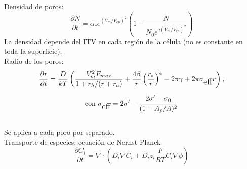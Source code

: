 \documentclass[a0,portrait]{a0poster}
\begin{document}
\begin{multicols}{2}

	Densidad de poros:
	\begin{equation}
		\frac{\partial N}{\partial t} = \alpha_c e^{(V_m/V_{ep})^2} 
			\left( 1 - \frac{N}{N_0 e^{q \left(V_m/V_{ep} \right) ^2}} \right)
	\end{equation}
	La densidad depende del ITV en cada región de la célula 
	(no es constante en toda la superficie).\\


	Radio de los poros:
	\begin{equation}
		\frac{\partial r}{\partial t} = \frac{D}{kT} \left( \frac{V_m^2 F_{max}}
			{1+r_h / (r+r_a)} + \frac{4 \beta}{r} \left(\frac{r_*}{r}\right)^4 
			- 2 \pi \gamma + 2 \pi \sigma_{\textrm{\tiny eff}} r\right), 
	\end{equation}

	\begin{equation}
		\textrm{con }\sigma_{\textrm{\tiny eff}} = 2 \sigma^\prime - 
			\frac{2 \sigma^\prime - \sigma_0}{(1 - A_p / A)^2}
	\end{equation}	\\
	


	Se aplica a cada poro por separado.\\


	Transporte de especies: ecuación de Nernst-Planck
	\begin{equation}
		\frac{\partial C_i}{\partial t} = \nabla \cdot \left( D_i \nabla C_i + D_i z_i 
			\frac{F}{R T} C_i \nabla \phi \right)
	\end{equation}	\\			


\end{multicols}
\end{document}
